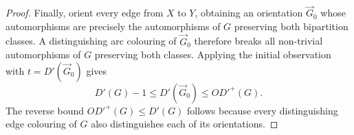 \documentclass[10pt,a4paper]{amsart}
\newcommand{\orG}{\ensuremath{\overrightarrow{G}}}
\begin{document}
\begin{proof}
Finally, orient every edge from $X$ to $Y$, obtaining an orientation $\orG_0$ whose automorphisms are precisely the automorphisms of $G$ preserving both bipartition classes. A distinguishing arc colouring of $\orG_0$ therefore breaks all non-trivial automorphisms of $G$ preserving both classes. Applying the initial observation with $t=D'(\orG_0)$ gives
\[
D'(G)-1\leq D'(\orG_0)\leq OD'^+(G).
\]
The reverse bound $OD'^+(G)\leq D'(G)$ follows because every distinguishing edge colouring of $G$ also distinguishes each of its orientations.
\end{proof}
\end{document}
